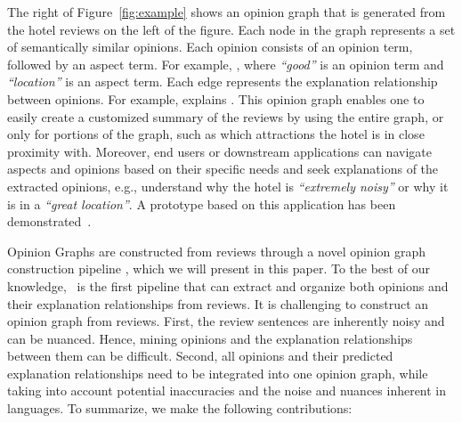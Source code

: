 The right of Figure~\ref{fig:example} shows an opinion graph that is generated from the hotel reviews on the left of the figure. Each node in the graph represents a set of semantically similar opinions. Each opinion consists of an opinion term, followed by an aspect term. For example, , where \textsl{``good''} is an opinion term and \textsl{``location''} is an aspect term. Each edge represents the explanation relationship between opinions. For example,  explains .
This opinion graph enables one to easily create a customized summary of the reviews by using the entire graph, or only for portions of the graph, such as which attractions the hotel is in close proximity with. 
Moreover, end users or downstream applications can navigate aspects and opinions based on their specific needs and seek explanations of the extracted opinions, e.g., understand why the hotel is \textsl{``extremely noisy''} or why it is in a \textsl{``great location''}. A prototype based on this application has been demonstrated~\cite{wang2020extremereader}.

Opinion Graphs are constructed from reviews through a novel opinion graph construction pipeline \system, which we will present in this paper. To the best of our knowledge, \system\ is the first pipeline that can extract and organize both opinions and their explanation relationships from reviews. 
It is challenging to construct an opinion graph from reviews. First, the review sentences are inherently noisy and can be nuanced. Hence, mining
opinions and the explanation relationships between them can be difficult. Second, all opinions and their predicted explanation relationships need to be integrated into one opinion graph, while taking into account potential inaccuracies and the noise and nuances inherent in languages.
To summarize, we make the following contributions:

